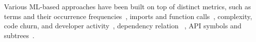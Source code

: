 Various ML-based approaches have been built on top of distinct metrics, such as terms and their occurrence frequencies~\cite{scandariato2014predicting}, imports and function calls~\cite{neuhaus2007predicting}, complexity, code churn, and developer activity~\cite{shin2010evaluating}, dependency relation ~\cite{neuhaus2009beauty}, API symbols and subtrees~\cite{yamaguchi2012generalized, yamaguchi2011vulnerability}.



